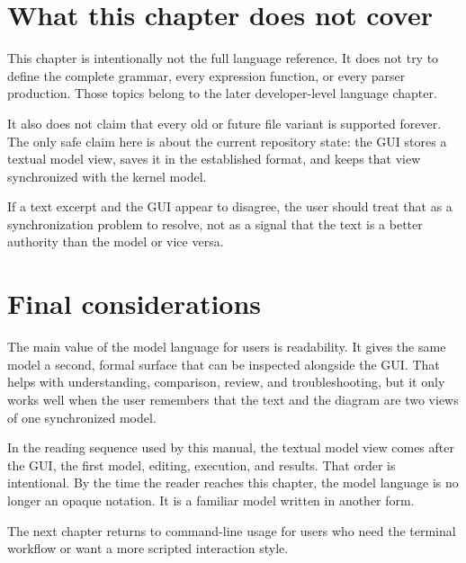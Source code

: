 \section{What this chapter does not cover}
\label{sec:model-language-limits}

This chapter is intentionally not the full language reference. It does not try
to define the complete grammar, every expression function, or every parser
production. Those topics belong to the later developer-level language chapter.

It also does not claim that every old or future file variant is supported
forever. The only safe claim here is about the current repository state: the
GUI stores a textual model view, saves it in the established format, and keeps
that view synchronized with the kernel model.

If a text excerpt and the GUI appear to disagree, the user should treat that as
a synchronization problem to resolve, not as a signal that the text is a better
authority than the model or vice versa.

\section{Final considerations}
\label{sec:model-language-final-considerations}

The main value of the model language for users is readability. It gives the
same model a second, formal surface that can be inspected alongside the GUI.
That helps with understanding, comparison, review, and troubleshooting, but it
only works well when the user remembers that the text and the diagram are two
views of one synchronized model.

In the reading sequence used by this manual, the textual model view comes after
the GUI, the first model, editing, execution, and results. That order is
intentional. By the time the reader reaches this chapter, the model language is
no longer an opaque notation. It is a familiar model written in another form.

The next chapter returns to command-line usage for users who need the terminal
workflow or want a more scripted interaction style.
